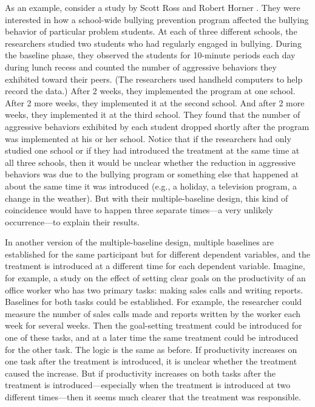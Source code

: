 As an example, consider a study by Scott Ross and Robert Horner \citep{ross_bully_2009}. They were interested in how a school-wide bullying prevention program affected the bullying behavior of particular problem students. At each of three different schools, the researchers studied two students who had regularly engaged in bullying. During the baseline phase, they observed the students for 10-minute periods each day during lunch recess and counted the number of aggressive behaviors they exhibited toward their peers. (The researchers used handheld computers to help record the data.) After 2 weeks, they implemented the program at one school. After 2 more weeks, they implemented it at the second school. And after 2 more weeks, they implemented it at the third school. They found that the number of aggressive behaviors exhibited by each student dropped shortly after the program was implemented at his or her school. Notice that if the researchers had only studied one school or if they had introduced the treatment at the same time at all three schools, then it would be unclear whether the reduction in aggressive behaviors was due to the bullying program or something else that happened at about the same time it was introduced (e.g., a holiday, a television program, a change in the weather). But with their multiple-baseline design, this kind of coincidence would have to happen three separate times---a very unlikely occurrence---to explain their results.

In another version of the multiple-baseline design, multiple baselines are established for the same participant but for different dependent variables, and the treatment is introduced at a different time for each dependent variable. Imagine, for example, a study on the effect of setting clear goals on the productivity of an office worker who has two primary tasks: making sales calls and writing reports. Baselines for both tasks could be established. For example, the researcher could measure the number of sales calls made and reports written by the worker each week for several weeks. Then the goal-setting treatment could be introduced for one of these tasks, and at a later time the same treatment could be introduced for the other task. The logic is the same as before. If productivity increases on one task after the treatment is introduced, it is unclear whether the treatment caused the increase. But if productivity increases on both tasks after the treatment is introduced---especially when the treatment is introduced at two different times---then it seems much clearer that the treatment was responsible.

